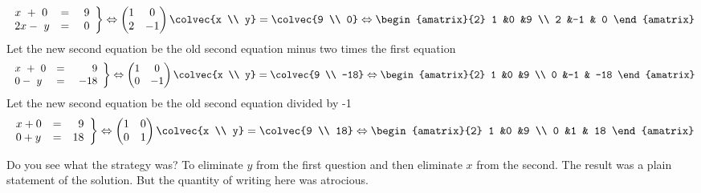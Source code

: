 \begin{example}
\begin{eqnarray*}
   \left.
\begin{array}{lcr}
	x\ +\ 0 & = & 9 \\
	2x-\ y & = &\  0 
     \end{array}
   \right\} 
   \Leftrightarrow
    \begin{pmatrix}
      1             &0  \\
      2             &-1
    \end{pmatrix}
  \colvec{x \\ y}
  =
  \colvec{9 \\ 0}
  \Leftrightarrow
 \begin{amatrix}{2}
1 &0 &9 \\ 2 &-1 & 0
\end{amatrix}
  \end{eqnarray*}
Let the new second equation be the old second equation minus two times the first equation 
\begin{eqnarray*}
   \left.
\begin{array}{lcr}
	x\ +\ 0 & = & 9 \\
	0-\ y & = &\  -18
     \end{array}
   \right\} 
   \Leftrightarrow
    \begin{pmatrix}
      1             &0  \\
      0             &-1
    \end{pmatrix}
  \colvec{x \\ y}
  =
  \colvec{9 \\ -18}
  \Leftrightarrow
 \begin{amatrix}{2}
1 &0 &9 \\ 0 &-1 & -18
\end{amatrix}
  \end{eqnarray*}
Let the new  second equation be the old second equation divided by -1
\begin{eqnarray*}
   \left.
\begin{array}{lcr}
	x + 0 & = & \ 9 \\
	0 + y & = &  18
     \end{array}
   \right\} 
   \Leftrightarrow
    \begin{pmatrix}
      1             &0  \\
      0             &1
    \end{pmatrix}
  \colvec{x \\ y}
  =
  \colvec{9 \\ 18}
  \Leftrightarrow
 \begin{amatrix}{2}
1 &0 &9 \\ 0 &1 & 18
\end{amatrix}
  \end{eqnarray*}
\end{example}
Do you see what the strategy was? To eliminate $y$ from the first question and then eliminate $x$ from the second. The result was a plain statement of the solution. But the quantity of writing here was atrocious. 

